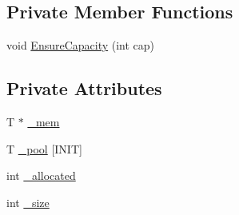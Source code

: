 \subsection*{Private Member Functions}
\begin{DoxyCompactItemize}
\item 
void \hyperlink{classtinyxml2_1_1_dyn_array_a60c1143094f43766c456bee9e329cae2}{Ensure\-Capacity} (int cap)
\end{DoxyCompactItemize}
\subsection*{Private Attributes}
\begin{DoxyCompactItemize}
\item 
T $\ast$ \hyperlink{classtinyxml2_1_1_dyn_array_a2fe3376b05543f93edf3ba1bc4947e6d}{\-\_\-mem}
\item 
T \hyperlink{classtinyxml2_1_1_dyn_array_ac00ff7104e1f9eb7a6d2e6f410cd7c12}{\-\_\-pool} \mbox{[}I\-N\-I\-T\mbox{]}
\item 
int \hyperlink{classtinyxml2_1_1_dyn_array_a9bcaa041ce3fcd254328200debebc979}{\-\_\-allocated}
\item 
int \hyperlink{classtinyxml2_1_1_dyn_array_a7177b0ed99f814eb04be4388f1f4320f}{\-\_\-size}
\end{DoxyCompactItemize}


